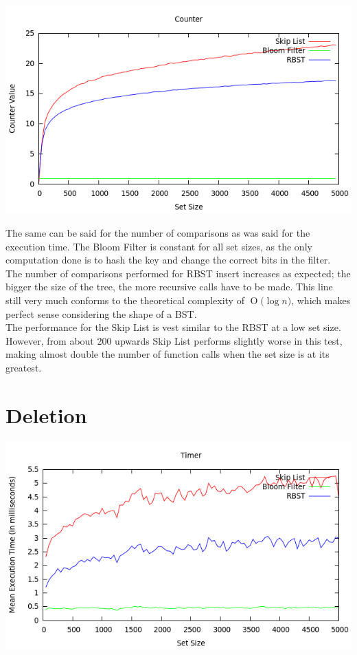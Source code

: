 \documentclass[11pt, notitlepage]{report}
\newcommand{\BigO}[1]{\ensuremath{\operatorname{O}\bigl(#1\bigr)}}
\begin{document}
\includegraphics[width=\linewidth]{img/Counter-Add}

The same can be said for the number of comparisons as was said for the execution time. The Bloom Filter is constant for all set sizes, as the only computation done is to hash the key and change the correct bits in the filter.\\

The number of comparisons performed for RBST insert increases as expected; the bigger the size of the tree, the more recursive calls have to be made. This line still very much conforms to the theoretical complexity of \BigO{\log n}, which makes perfect sense considering the shape of a BST.\\

The performance for the Skip List is vest similar to the RBST at a low set size. However, from about 200 upwards Skip List performs slightly worse in this test, making almost double the number of function calls when the set size is at its greatest.

\section*{Deletion}

\includegraphics[width=\linewidth]{img/Timer-Del}
\end{document}
